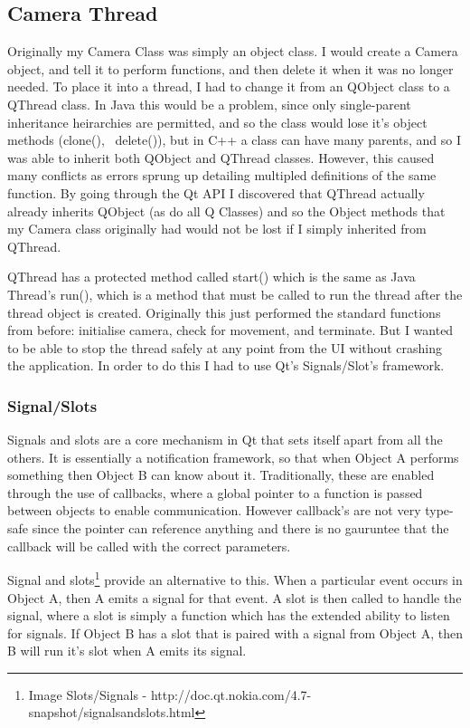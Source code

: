 \documentclass[11pt]{article} %
\begin{document}
{{\subsection{Camera Thread}
Originally my Camera Class was simply an object class. I would create a Camera object, and tell it to perform functions, and then delete it when it was no longer needed. To place it into a thread, I had to change it from an QObject class to a QThread class. In Java this would be a problem, since only single-parent inheritance heirarchies are permitted, and so the class would lose it's object methods (clone(), ~delete()), but in C++ a class can have many parents, and so I was able to inherit both QObject and QThread classes.
However, this caused many conflicts as errors sprung up detailing multipled definitions of the same function. By going through the Qt API I discovered that QThread actually already inherits QObject (as do all Q Classes) and so the Object methods that my Camera class originally had would not be lost if I simply inherited from QThread.

QThread has a protected method called start() which is the same as Java Thread's run(), which is a method that must be called to run the thread after the thread object is created. Originally this just performed the standard functions from before:  initialise camera, check for movement, and terminate. But I wanted to be able to stop the thread safely at any point from the UI without crashing the application. In order to do this I had to use Qt's Signals/Slot's framework.

\subsubsection{Signal/Slots}
Signals and slots are a core mechanism in Qt that sets itself apart from all the others. It is essentially a notification framework, so that when Object A performs something then Object B can know about it.  Traditionally, these are enabled through the use of callbacks, where a global pointer to a function is passed between objects to enable communication. However callback's are not very type-safe since the pointer can reference anything and there is no gauruntee that the callback will be called with the correct parameters.

Signal and slots\footnote{Image Slots/Signals - http://doc.qt.nokia.com/4.7-snapshot/signalsandslots.html} provide an alternative to this. When a particular event occurs in Object A, then A emits a signal for that event. A slot  is then called to handle the signal, where a slot is simply a function which has the extended ability to listen for signals. If Object B has a slot that is paired with a signal from Object A, then  B will run it's slot when A emits its signal.

}}
\end{document}
